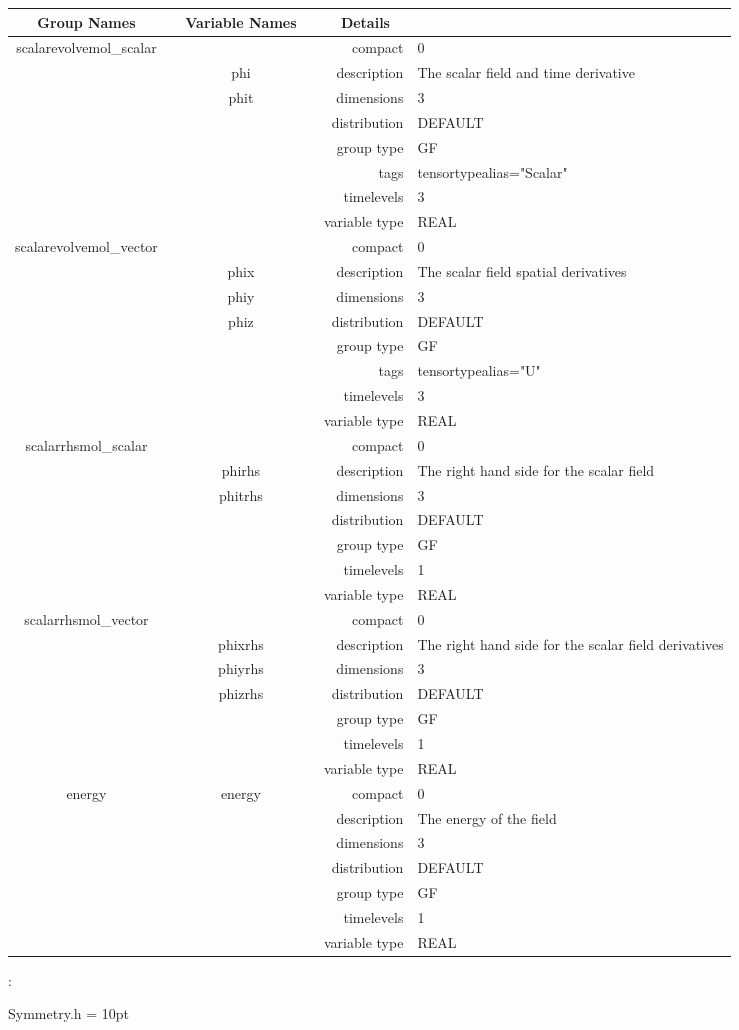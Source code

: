 \begin{tabular*}{150mm}{|c|c@{\extracolsep{\fill}}|rl|} \hline 
~ {\bf Group Names} ~ & ~ {\bf Variable Names} ~  &{\bf Details} ~ & ~\\ 
\hline 
scalarevolvemol\_scalar &  & compact & 0 \\ 
 & phi & description & The scalar field and time derivative \\ 
 & phit & dimensions & 3 \\ 
 &  & distribution & DEFAULT \\ 
 &  & group type & GF \\ 
 &  & tags & tensortypealias="Scalar" \\ 
 &  & timelevels & 3 \\ 
 &  & variable type & REAL \\ 
\hline 
scalarevolvemol\_vector &  & compact & 0 \\ 
 & phix & description & The scalar field spatial derivatives \\ 
 & phiy & dimensions & 3 \\ 
 & phiz & distribution & DEFAULT \\ 
 &  & group type & GF \\ 
 &  & tags & tensortypealias="U" \\ 
 &  & timelevels & 3 \\ 
 &  & variable type & REAL \\ 
\hline 
scalarrhsmol\_scalar &  & compact & 0 \\ 
 & phirhs & description & The right hand side for the scalar field \\ 
 & phitrhs & dimensions & 3 \\ 
 &  & distribution & DEFAULT \\ 
 &  & group type & GF \\ 
 &  & timelevels & 1 \\ 
 &  & variable type & REAL \\ 
\hline 
scalarrhsmol\_vector &  & compact & 0 \\ 
 & phixrhs & description & The right hand side for the scalar field derivatives \\ 
 & phiyrhs & dimensions & 3 \\ 
 & phizrhs & distribution & DEFAULT \\ 
 &  & group type & GF \\ 
 &  & timelevels & 1 \\ 
 &  & variable type & REAL \\ 
\hline 
energy & energy & compact & 0 \\ 
 &  & description & The energy of the field \\ 
 &  & dimensions & 3 \\ 
 &  & distribution & DEFAULT \\ 
 &  & group type & GF \\ 
 &  & timelevels & 1 \\ 
 &  & variable type & REAL \\ 
\hline 
\end{tabular*} 



\vspace{5mm}

: 

Symmetry.h
\vspace{2mm}\parskip = 10pt 
